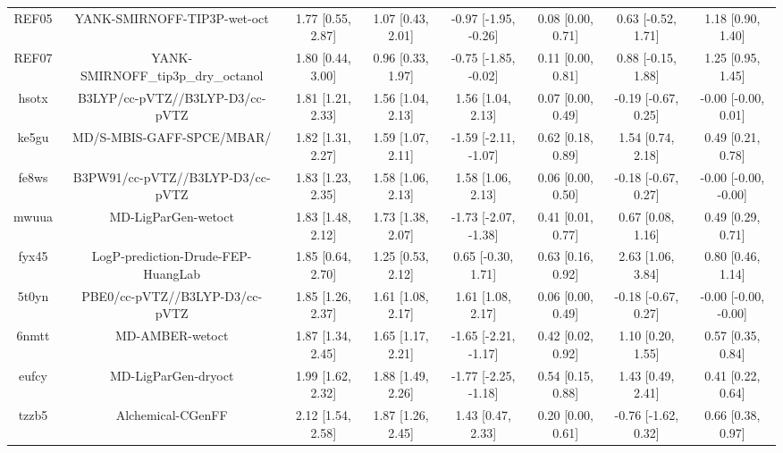\documentclass{article}
\begin{document}
\begin{center}
\begin{longtable}{|cccccccc|}
 REF05 &                        YANK-SMIRNOFF-TIP3P-wet-oct &  1.77 [0.55, 2.87] &  1.07 [0.43, 2.01] &  -0.97 [-1.95, -0.26] &  0.08 [0.00, 0.71] &   0.63 [-0.52, 1.71] &     1.18 [0.90, 1.40] \\
 REF07 &                 YANK-SMIRNOFF\_tip3p\_dry\_octanol &  1.80 [0.44, 3.00] &  0.96 [0.33, 1.97] &  -0.75 [-1.85, -0.02] &  0.11 [0.00, 0.81] &   0.88 [-0.15, 1.88] &     1.25 [0.95, 1.45] \\
 hsotx &                    B3LYP/cc-pVTZ//B3LYP-D3/cc-pVTZ &  1.81 [1.21, 2.33] &  1.56 [1.04, 2.13] &     1.56 [1.04, 2.13] &  0.07 [0.00, 0.49] &  -0.19 [-0.67, 0.25] &   -0.00 [-0.00, 0.01] \\
 ke5gu &                          MD/S-MBIS-GAFF-SPCE/MBAR/ &  1.82 [1.31, 2.27] &  1.59 [1.07, 2.11] &  -1.59 [-2.11, -1.07] &  0.62 [0.18, 0.89] &    1.54 [0.74, 2.18] &     0.49 [0.21, 0.78] \\
 fe8ws &                   B3PW91/cc-pVTZ//B3LYP-D3/cc-pVTZ &  1.83 [1.23, 2.35] &  1.58 [1.06, 2.13] &     1.58 [1.06, 2.13] &  0.06 [0.00, 0.50] &  -0.18 [-0.67, 0.27] &  -0.00 [-0.00, -0.00] \\
 mwuua &                                MD-LigParGen-wetoct &  1.83 [1.48, 2.12] &  1.73 [1.38, 2.07] &  -1.73 [-2.07, -1.38] &  0.41 [0.01, 0.77] &    0.67 [0.08, 1.16] &     0.49 [0.29, 0.71] \\
 fyx45 &                 LogP-prediction-Drude-FEP-HuangLab &  1.85 [0.64, 2.70] &  1.25 [0.53, 2.12] &    0.65 [-0.30, 1.71] &  0.63 [0.16, 0.92] &    2.63 [1.06, 3.84] &     0.80 [0.46, 1.14] \\
 5t0yn &                     PBE0/cc-pVTZ//B3LYP-D3/cc-pVTZ &  1.85 [1.26, 2.37] &  1.61 [1.08, 2.17] &     1.61 [1.08, 2.17] &  0.06 [0.00, 0.49] &  -0.18 [-0.67, 0.27] &  -0.00 [-0.00, -0.00] \\
 6nmtt &                                    MD-AMBER-wetoct &  1.87 [1.34, 2.45] &  1.65 [1.17, 2.21] &  -1.65 [-2.21, -1.17] &  0.42 [0.02, 0.92] &    1.10 [0.20, 1.55] &     0.57 [0.35, 0.84] \\
 eufcy &                                MD-LigParGen-dryoct &  1.99 [1.62, 2.32] &  1.88 [1.49, 2.26] &  -1.77 [-2.25, -1.18] &  0.54 [0.15, 0.88] &    1.43 [0.49, 2.41] &     0.41 [0.22, 0.64] \\
 tzzb5 &                                  Alchemical-CGenFF &  2.12 [1.54, 2.58] &  1.87 [1.26, 2.45] &     1.43 [0.47, 2.33] &  0.20 [0.00, 0.61] &  -0.76 [-1.62, 0.32] &     0.66 [0.38, 0.97] \\

\end{longtable}
\end{center}
\end{document}
